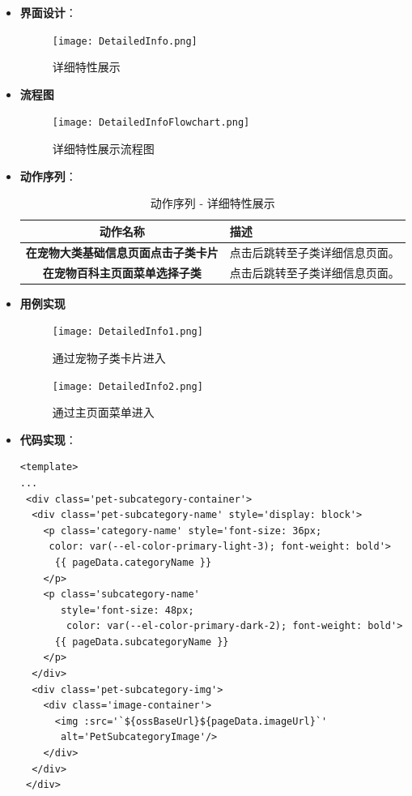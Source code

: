 \begin{itemize}
	\item \textbf{界面设计}：
	\begin{figure}[H]
		\centering
		\texttt{[image: DetailedInfo.png]}
		\caption{详细特性展示}
		\label{详细特性展示}
	\end{figure}
	
	\item \textbf{流程图}
	
	\begin{figure}[H]
		\centering
		\texttt{[image: DetailedInfoFlowchart.png]}
		\caption{详细特性展示流程图}
		\label{详细特性展示流程图}
	\end{figure}
	
	\item \textbf{动作序列}：
	\begin{table}[H]
		\centering
		\caption{动作序列 - 详细特性展示}
		\renewcommand\arraystretch{1.5}
		\begin{tabular}{|c|>{\raggedright\arraybackslash}p{10cm}|}
			\hline
			\textbf{动作名称} & \textbf{描述} \\ \hline
			\textbf{在宠物大类基础信息页面点击子类卡片} & 点击后跳转至子类详细信息页面。\\ \hline
			\textbf{在宠物百科主页面菜单选择子类} & 点击后跳转至子类详细信息页面。\\ \hline
		\end{tabular}
	\end{table}
	
	\item \textbf{用例实现}
	
	\begin{figure}[H]
		\centering
		\texttt{[image: DetailedInfo1.png]}
		\caption{通过宠物子类卡片进入}
		\label{通过宠物子类卡片进入}
	\end{figure}
	
	\begin{figure}[H]
		\centering
		\texttt{[image: DetailedInfo2.png]}
		\caption{通过主页面菜单进入}
		\label{通过主页面菜单进入}
	\end{figure}
	
	\item \textbf{代码实现}：
	\begin{verbatim}
<template>
...
 <div class='pet-subcategory-container'>
  <div class='pet-subcategory-name' style='display: block'>
    <p class='category-name' style='font-size: 36px;
     color: var(--el-color-primary-light-3); font-weight: bold'>
      {{ pageData.categoryName }}
    </p>
    <p class='subcategory-name'
       style='font-size: 48px;
        color: var(--el-color-primary-dark-2); font-weight: bold'>
      {{ pageData.subcategoryName }}
    </p>
  </div>
  <div class='pet-subcategory-img'>
    <div class='image-container'>
      <img :src='`${ossBaseUrl}${pageData.imageUrl}`'
       alt='PetSubcategoryImage'/>
    </div>
  </div>
 </div>
	

\end{verbatim}
\end{itemize}

